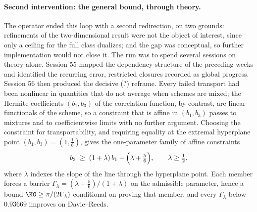 \paragraph{Second intervention: the general bound, through theory.}
The operator ended this loop with a second redirection, on two grounds:
refinements of the two-dimensional result were not the object of interest,
since only a ceiling for the full class dualizes; and the gap was
conceptual, so further implementation would not close it. The run was to
spend several sessions on theory alone. Session 55 mapped the dependency
structure of the preceding weeks and identified the recurring error,
restricted closures recorded as global progress. Session 56 then produced
the {\color{red}decisive (?)} reframe. Every failed transport had been nonlinear in
quantities that do not average when schemes are mixed; the Hermite
coefficients $(b_1,b_3)$ of the correlation function, by contrast, are
linear functionals of the scheme, so a constraint that is affine in
$(b_1,b_3)$ passes to mixtures and to coefficientwise limits with no further
argument. Choosing the constraint for transportability, and requiring
equality at the extremal hyperplane point $(b_1,b_3)=(1,\tfrac16)$, gives
the one-parameter family of affine constraints
\[
        b_3\;\ge\;(1+\lambda)\,b_1-\Bigl(\lambda+\tfrac56\Bigr),
        \qquad \lambda\ge\tfrac12 ,
\]
where $\lambda$ indexes the slope of the line through the hyperplane point.
Each member forces a barrier $\Gamma_\lambda=(\lambda+\frac56)/(1+\lambda)$
on the admissible parameter, hence a bound $\KG\ge\pi/(2\Gamma_\lambda)$
conditional on proving that member, and every $\Gamma_\lambda$ below
$0.93669$ improves on Davie--Reeds.


